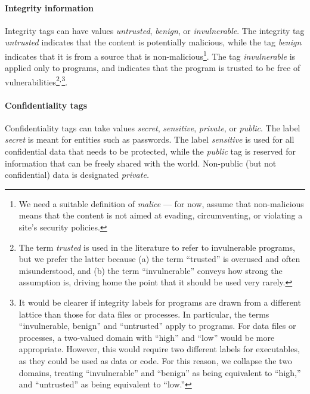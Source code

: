 \documentclass[10pt, conference, onecolumn]{IEEEtran}
\begin{document}
\paragraph{Integrity information}
Integrity tags can have values {\em untrusted}, {\em benign}, or {\em invulnerable}.
The integrity tag {\em untrusted} indicates that the content is potentially malicious, 
while the tag {\em benign} indicates that it is from a source that is non-malicious\footnote{We need a
  suitable definition of {\em malice} --- for now, assume that non-malicious
  means that the content is not aimed at evading, circumventing, or violating a
  site's security policies.}. The tag {\em invulnerable} is applied only to
programs, and indicates that the program is trusted to be free of
vulnerabilities\footnote{The term {\em trusted} is used in the literature to
  refer to invulnerable programs, but we prefer the latter because (a) the term
  ``trusted'' is overused and often misunderstood, and (b) the term
  ``invulnerable'' conveys how strong the assumption is, driving home the point
  that it should be used very rarely.}$^{,}$\footnote{It would be clearer if
  integrity labels for programs are drawn from a different lattice than those
  for data files or processes. In particular, the terms ``invulnerable, benign''
  and ``untrusted'' apply to programs. For data files or processes, a two-valued
  domain with ``high'' and ``low'' would be more appropriate. However, this
  would require two different labels for executables, as they could be used as
  data or code. For this reason, we collapse the two domains, treating
  ``invulnerable'' and ``benign'' as being equivalent to ``high,'' and
  ``untrusted'' as being equivalent to ``low.''}.

\paragraph{Confidentiality tags}
Confidentiality tags can take values {\em secret}, {\em sensitive}, {\em private}, or {\em public}.
The label {\em secret} is meant for entities such as passwords. The label {\em
  sensitive} is used for all confidential data that needs to be protected, while
the {\em public} tag is reserved for information that can be freely shared with
the world. Non-public (but not confidential) data is designated {\em private.}

\end{document}
